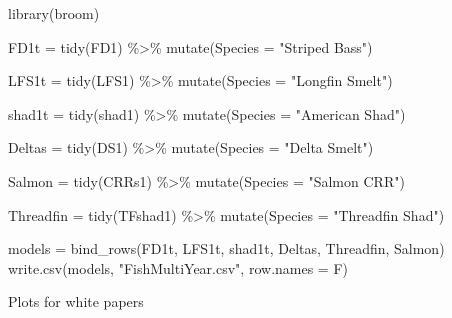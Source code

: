 \documentclass[
]{article}
\newenvironment{Shaded}{\begin{snugshade}}{\end{snugshade}}
\newcommand{\AttributeTok}[1]{\textcolor[rgb]{0.77,0.63,0.00}{#1}}
\newcommand{\FunctionTok}[1]{\textcolor[rgb]{0.00,0.00,0.00}{#1}}
\newcommand{\NormalTok}[1]{#1}
\newcommand{\OtherTok}[1]{\textcolor[rgb]{0.56,0.35,0.01}{#1}}
\newcommand{\SpecialCharTok}[1]{\textcolor[rgb]{0.00,0.00,0.00}{#1}}
\newcommand{\StringTok}[1]{\textcolor[rgb]{0.31,0.60,0.02}{#1}}
\begin{document}
\begin{Shaded}
\begin{Highlighting}[]
\FunctionTok{library}\NormalTok{(broom)}

\NormalTok{FD1t }\OtherTok{=} \FunctionTok{tidy}\NormalTok{(FD1) }\SpecialCharTok{\%\textgreater{}\%}
  \FunctionTok{mutate}\NormalTok{(}\AttributeTok{Species =} \StringTok{"Striped Bass"}\NormalTok{)}

\NormalTok{LFS1t }\OtherTok{=} \FunctionTok{tidy}\NormalTok{(LFS1) }\SpecialCharTok{\%\textgreater{}\%}
  \FunctionTok{mutate}\NormalTok{(}\AttributeTok{Species =} \StringTok{"Longfin Smelt"}\NormalTok{)}

\NormalTok{shad1t }\OtherTok{=} \FunctionTok{tidy}\NormalTok{(shad1) }\SpecialCharTok{\%\textgreater{}\%}
  \FunctionTok{mutate}\NormalTok{(}\AttributeTok{Species =} \StringTok{"American Shad"}\NormalTok{)}


\NormalTok{Deltas }\OtherTok{=} \FunctionTok{tidy}\NormalTok{(DS1) }\SpecialCharTok{\%\textgreater{}\%}
  \FunctionTok{mutate}\NormalTok{(}\AttributeTok{Species =} \StringTok{"Delta Smelt"}\NormalTok{)}

\NormalTok{Salmon }\OtherTok{=} \FunctionTok{tidy}\NormalTok{(CRRs1) }\SpecialCharTok{\%\textgreater{}\%}
  \FunctionTok{mutate}\NormalTok{(}\AttributeTok{Species =} \StringTok{"Salmon CRR"}\NormalTok{)}

\NormalTok{Threadfin }\OtherTok{=} \FunctionTok{tidy}\NormalTok{(TFshad1) }\SpecialCharTok{\%\textgreater{}\%}
  \FunctionTok{mutate}\NormalTok{(}\AttributeTok{Species =} \StringTok{"Threadfin Shad"}\NormalTok{)}

\NormalTok{models }\OtherTok{=} \FunctionTok{bind\_rows}\NormalTok{(FD1t, LFS1t, shad1t, Deltas, Threadfin, Salmon)}
\FunctionTok{write.csv}\NormalTok{(models, }\StringTok{"FishMultiYear.csv"}\NormalTok{, }\AttributeTok{row.names =}\NormalTok{ F)}
\end{Highlighting}
\end{Shaded}

Plots for white papers
\end{document}

